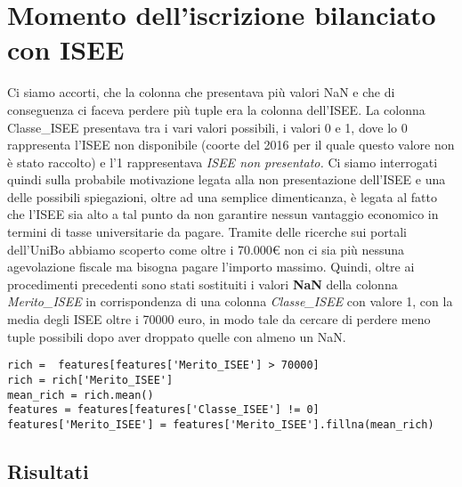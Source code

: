 \documentclass[../../Report.tex]{subfiles}
\begin{document}
\section{Momento dell'iscrizione bilanciato con ISEE}
Ci siamo accorti, che la colonna che presentava più valori NaN e che di conseguenza ci faceva perdere più tuple era la colonna dell'ISEE. La colonna Classe\_ISEE presentava tra i vari valori possibili, i valori 0 e 1, dove lo 0 rappresenta l'ISEE non disponibile (coorte del 2016 per il quale questo valore non è stato raccolto) e l'1 rappresentava \emph{ISEE non presentato.} Ci siamo interrogati quindi sulla probabile motivazione legata alla non presentazione dell'ISEE e una delle possibili spiegazioni, oltre ad una semplice dimenticanza, è legata al fatto che l'ISEE sia alto a tal punto da non garantire nessun vantaggio economico in termini di tasse universitarie da pagare. Tramite delle ricerche sui portali dell'UniBo abbiamo scoperto come oltre i 70.000€ non ci sia più nessuna agevolazione fiscale ma bisogna pagare l'importo massimo. Quindi, oltre ai procedimenti precedenti sono stati sostituiti i valori \textbf{NaN} della colonna \emph{Merito\_ISEE} in corrispondenza di una colonna \emph{Classe\_ISEE} con valore 1, con la media degli ISEE oltre i 70000 euro, in modo tale da cercare di perdere meno tuple possibili dopo aver droppato quelle con almeno un NaN.\\

\begin{lstlisting}
rich =  features[features['Merito_ISEE'] > 70000]
rich = rich['Merito_ISEE']
mean_rich = rich.mean()
features = features[features['Classe_ISEE'] != 0]
features['Merito_ISEE'] = features['Merito_ISEE'].fillna(mean_rich)
\end{lstlisting}

\subsection{Risultati}
\end{document}
